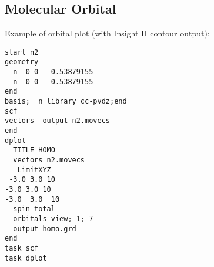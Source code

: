 \subsection*{Molecular Orbital}

Example of orbital plot (with Insight II contour output):
\begin{verbatim}
start n2
geometry
  n  0 0   0.53879155
  n  0 0  -0.53879155
end
basis;  n library cc-pvdz;end
scf
vectors  output n2.movecs
end
dplot
  TITLE HOMO
  vectors n2.movecs
   LimitXYZ
 -3.0 3.0 10  
-3.0 3.0 10 
-3.0  3.0  10
  spin total
  orbitals view; 1; 7
  output homo.grd
end
task scf     
task dplot
\end{verbatim}
